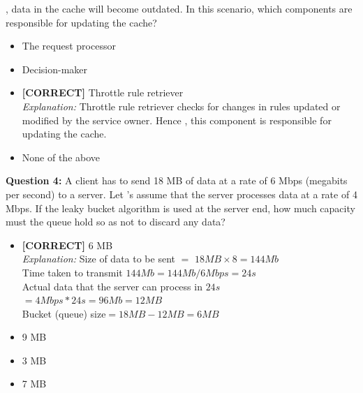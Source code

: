 , data in the cache will become outdated. In this scenario, which components are responsible for updating the cache?
\\[0.2cm]
\begin{itemize}
 \item The request processor
 \item Decision-maker
 \item \textbf{[CORRECT]} Throttle rule retriever
\\[0.1cm]
\textit{Explanation:} 
Throttle rule retriever checks for changes in rules updated or modified by the service owner. Hence , this component is responsible for updating the cache.
 \item None of the above
\end{itemize}
\vspace{0.3cm}
\noindent
\textbf{Question 4:} A client has to send 18 MB of data at a rate of 6 Mbps (megabits per second) to a server. Let
's assume that the server processes data at a rate of 4 Mbps. If the leaky bucket algorithm is used at the server end, how much capacity must the queue hold so as not to discard any data?
\\[0.2cm]
\begin{itemize}
 \item \textbf{[CORRECT]} 6 MB
\\[0.1cm]
\textit{Explanation:} 
Size of data to be sent {{\(=\)}} {{\(18MB \times 8= 144Mb\)}}
\\
Time taken to transmit {{\(144Mb\)}}{{\(= 144Mb/6Mbps=24s\)}}
\\
Actual data that the server can process in {{\(24s\)}}{{\(=4Mbps*24s=96Mb=12MB\)}}
\\
Bucket (queue) size{{\(=18MB-12MB=6MB\)}}
 \item 9 MB
 \item 3 MB
 \item 7 MB
\end{itemize}


